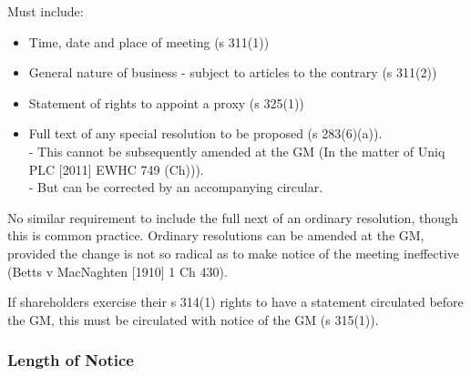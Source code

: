 \documentclass[
]{article}
\providecommand{\tightlist}{%
  \setlength{\itemsep}{0pt}\setlength{\parskip}{0pt}}
\begin{document}
Must include:

\begin{itemize}
\tightlist
\item
  Time, date and place of meeting (s 311(1))
\item
  General nature of business - subject to articles to the contrary (s
  311(2))
\item
  Statement of rights to appoint a proxy (s 325(1))
\item
  Full text of any special resolution to be proposed (s 283(6)(a)).\\
  - This cannot be subsequently amended at the GM (In the matter of Uniq
  PLC {[}2011{]} EWHC 749 (Ch))).\\
  - But can be corrected by an accompanying circular.
\end{itemize}

No similar requirement to include the full next of an ordinary
resolution, though this is common practice. Ordinary resolutions can be
amended at the GM, provided the change is not so radical as to make
notice of the meeting ineffective (Betts v MacNaghten {[}1910{]} 1 Ch
430).

If shareholders exercise their s 314(1) rights to have a statement
circulated before the GM, this must be circulated with notice of the GM
(s 315(1)).

\hypertarget{length-of-notice}{%
\subsubsection{Length of Notice}\label{length-of-notice}}
\end{document}
